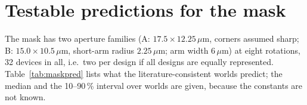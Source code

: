 \section{Testable predictions for the mask}\label{sec:falsify}
The mask has two aperture families (A: $17.5\times12.25\,\mu$m, corners assumed sharp; B: $15.0\times10.5\,\mu$m, short-arm radius $2.25\,\mu$m; arm width $6\,\mu$m) at eight rotations, 32 devices in all, i.e.\ two per design if all designs are equally represented.
Table~\ref{tab:maskpred} lists what the \nMaskWorlds{} literature-consistent worlds predict; the median and the 10--90\,\% interval over worlds are given, because the constants are not known.
\begin{table}[H]\centering\small\resizebox{\textwidth}{!}{\tabMaskPred}\caption{Predictions for the 16 designs of the mask (rotation from the native axis $x$). Azimuth of the low-current state in the crystal frame: axial mean over worlds (0$^\circ$ and 180$^\circ$ are the same direction) with the resultant length $R$ in brackets ($R$ near 1: the worlds agree; near 0: they do not).}\label{tab:maskpred}\end{table}
\begin{table}[H]\centering\small\tabOrder\caption{Pairwise orderings of yield across worlds.}\label{tab:order}\end{table}
